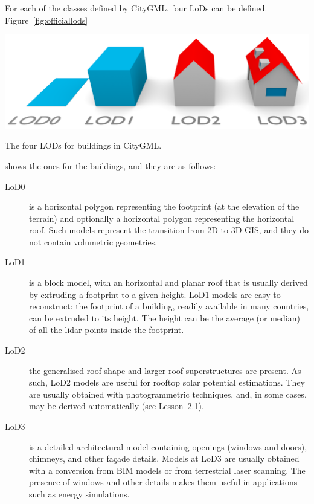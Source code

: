 For each of the classes defined by CityGML, four LoDs can be defined.
Figure~\ref{fig:officiallods}
\begin{marginfigure}
  \centering
  \includegraphics[width=\textwidth]{figs/CityGML-LODs-c3.png}
  \caption{The four LODs for buildings in CityGML\@.}%
\label{fig:officiallods}
\end{marginfigure}
shows the ones for the buildings, and they are as follows:
\begin{description}
  \item[LoD0] is a horizontal polygon representing the footprint (at the elevation of the terrain) and optionally a horizontal polygon representing the horizontal roof.
  Such models represent the transition from 2D to 3D GIS, and they do not contain volumetric geometries.
  \item[LoD1] is a block model, with an horizontal and planar roof that is usually derived by extruding a footprint to a given height.
  LoD1 models are easy to reconstruct: the footprint of a building, readily available in many countries, can be extruded to its height. The height can be the average (or median) of all the lidar points inside the footprint.
  \item[LoD2] the generalised roof shape and larger roof superstructures are present.
  As such, LoD2 models are useful for rooftop solar potential estimations.
  They are usually obtained with photogrammetric techniques, and, in some cases, may be derived automatically (see Lesson~2.1). 
  \item[LoD3] is a detailed architectural model containing openings (windows and doors), chimneys, and other façade details.
  Models at LoD3 are usually obtained with a conversion from BIM models or from terrestrial laser scanning.
  The presence of windows and other details makes them useful in applications such as energy simulations.
\end{description}

%

